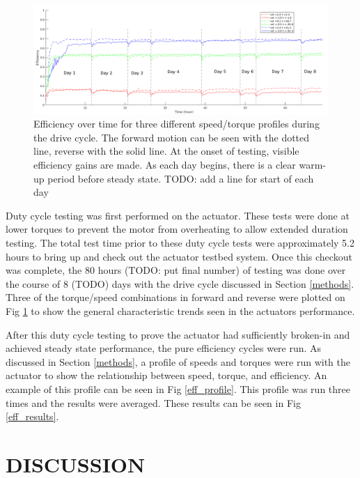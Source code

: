 \documentclass[letterpaper, 10 pt, conference]{ieeeconf}  %
\begin{document}
   \begin{figure}[t]
      \centering
      \includegraphics[width=\linewidth]{long_run_plot_v3}
      \caption{Efficiency over time for three different speed/torque profiles during the drive cycle. The forward motion can be seen with the dotted line, reverse with the solid line. At the onset of testing, visible efficiency gains are made. As each day begins, there is a clear warm-up period before steady state. TODO: add a line for start of each day}
      \label{long_run}
   \end{figure}
   
Duty cycle testing was first performed on the actuator. These tests were done at lower torques to prevent the motor from overheating to allow extended duration testing. The total test time prior to these duty cycle tests were approximately 5.2 hours to bring up and check out the actuator testbed system. Once this checkout was complete, the 80 hours (TODO: put final number) of testing was done over the course of 8 (TODO) days with the drive cycle discussed in Section \ref{methods}. Three of the torque/speed combinations in forward and reverse were plotted on Fig \ref{long_run} to show the general characteristic trends seen in the actuators performance. 
   
After this duty cycle testing to prove the actuator had sufficiently broken-in and achieved steady state performance, the pure efficiency cycles were run. As discussed in Section \ref{methods}, a profile of speeds and torques were run with the actuator to show the relationship between speed, torque, and efficiency. An example of this profile can be seen in Fig \ref{eff_profile}. This profile was run three times and the results were averaged. These results can be seen in Fig \ref{eff_results}. 

\section{DISCUSSION} \label{discussion}
\end{document}
